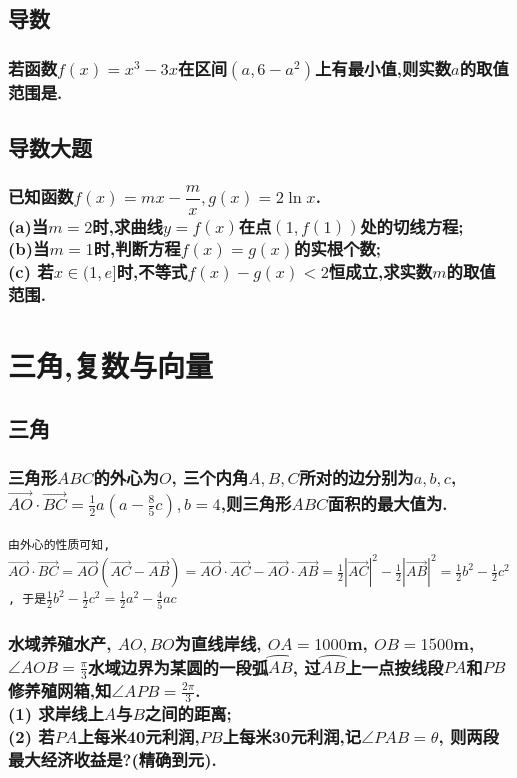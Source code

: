 \documentclass[oneside]{book}
\newcommand{\1}{\underline{\makebox[1cm]{}}}
\newcommand{\2}{\underline{\makebox[2cm]{}}}
\newcommand{\3}{\underline{\makebox[3cm]{}}}
\newcommand{\4}{\underline{\makebox[4cm]{}}}
\newcommand{\blkc}{\vspace*{6\baselineskip} }
\newcommand{\lge}{\large \texttt}
\newcommand{\xl}{\overrightarrow}
\newlength{\la}
\begin{document}
    \chapter{导数}
        \section{若函数$f(x)=x^3-3x$在区间$(a,6-a^2)$上有最小值,则实数$a$的取值范围是\2.} 
        \blkc
    
    \chapter{导数大题}
        \section{已知函数$f(x)=mx-\dfrac{m}{x}, g(x)=2\ln x$. \\(a)当$m=2$时,求曲线$y=f(x)$在点$(1, f(1))$处的切线方程; \\(b)当$m=1$时,判断方程$f(x)=g(x)$的实根个数; \\(c) 若$x \in (1, e]$时,不等式$f(x)-g(x)<2$恒成立,求实数$m$的取值范围.}



\part{三角,复数与向量}

    \chapter{三角}
        \section{三角形$ABC$的外心为$O$, 三个内角$A, B, C$所对的边分别为$a, b, c$, $ \xl{AO} \cdot \xl{BC} = \frac{1}{2}a(a-\frac{8}{5}c), b = 4$,则三角形$ABC$面积的最大值为\2.}
        \lge{由外心的性质可知, $\xl{AO} \cdot \xl{BC} = \xl{AO}(\xl{AC}-\xl{AB}) = \xl{AO} \cdot \xl{AC} - \xl{AO} \cdot \xl{AB} = \frac{1}{2}|\xl{AC}|^2 - \frac{1}{2}|\xl{AB}|^2 = \frac{1}{2}b^2 - \frac{1}{2}c^2$, 于是$
        \frac{1}{2}b^2 - \frac{1}{2}c^2 = \frac{1}{2}a^2 - \frac{4}{5}ac$}

        \section{水域养殖水产, $AO, BO$为直线岸线, $OA = 1000$m, $OB = 1500$m, $\angle{AOB} = \frac{\pi}{3}$水域边界为某圆的一段弧$\wideparen{AB}$, 过$\wideparen{AB}$上一点按线段$PA$和$PB$修养殖网箱,知$\angle{APB} = \frac{2\pi}{3}$.
        \\(1) 求岸线上$A$与$B$之间的距离;
        \\(2) 若$PA$上每米40元利润,$PB$上每米30元利润,记$\angle{PAB} = \theta$, 则两段最大经济收益是?(精确到元).
        }
\end{document}

